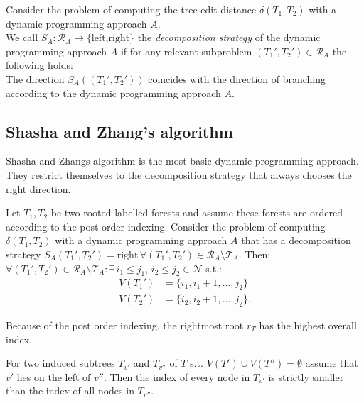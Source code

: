 \begin{defin}
Consider the problem of computing the tree edit distance $\delta(T_1,T_2)$ with a dynamic programming approach $A$.\\
We call $S_A : \mathcal{R}_A \mapsto \{\text{left,right}\}$ the \textit{decomposition strategy} of the dynamic programming approach $A$ if for any relevant subproblem  $(T_1',T_2') \in \mathcal{R}_A$ the following holds: \\
The direction $S_A((T_1',T_2'))$ coincides with the direction of branching according to the dynamic programming approach $A$.
\end{defin}


\subsection{Shasha and Zhang's algorithm}
Shasha and Zhangs algorithm is the most basic dynamic programming approach. They restrict themselves to the decomposition strategy that always chooses the right direction. 
\begin{lem}\label{lem:sets}
Let $T_1,T_2$ be two rooted labelled forests and assume these forests are ordered according to the post order indexing. Consider the problem of computing  $\delta(T_1,T_2)$ with a dynamic programming approach $A$ that has a decomposition strategy $S_A(T_1',T_2') = \text{right} \, \forall (T_1',T_2') \in \mathcal{R}_A \setminus \mathcal{T}_A$. Then:\\
$\forall (T_1',T_2') \in \mathcal{R}_A \setminus \mathcal{T}_A : \exists \, i_1 \leq j_1,\, i_2 \leq j_2 \in \mathcal{N}$ s.t.:\\
 \begin{align*}
 V(T_1') &= \{i_1,i_1+1,...,j_2\} \\
 V(T_2') &= \{i_2,i_2+1,...,j_2\}.
 \end{align*}
\end{lem}
\begin{rem}[Remark 1]
Because of the post order indexing, the rightmost root $r_T$ has the highest overall index.
\end{rem}
\begin{rem}[Remark 2] 
For two induced subtrees $T_{v'}$ and $T_{v''}$ of $T$ s.t. $V(T') \cup V(T'') = \emptyset$ assume that $v'$ lies on the left of $v''$. Then the index of every node in $T_{v'}$ is strictly smaller than the index of all nodes in $T_{v''}$.
\end{rem}
